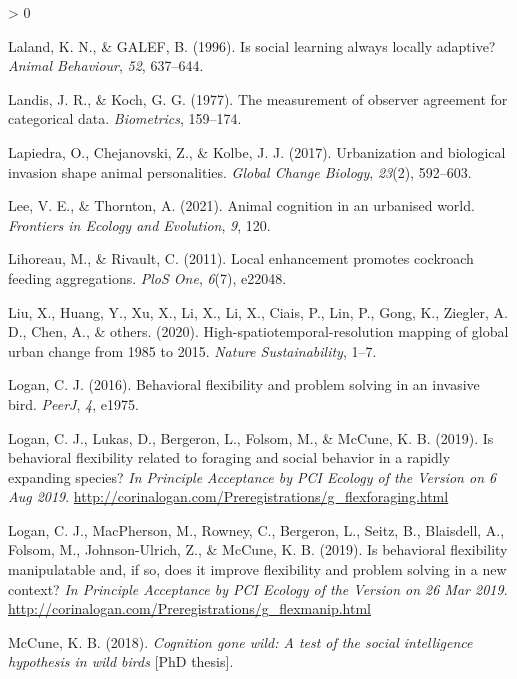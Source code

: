 \documentclass[
]{article}
\newlength{\cslhangindent}
\newenvironment{CSLReferences}[2] %
 {%
  \setlength{\parindent}{0pt}
  \ifodd #1 \everypar{\setlength{\hangindent}{\cslhangindent}}\ignorespaces\fi
  \ifnum #2 > 0
  \setlength{\parskip}{#2\baselineskip}
  \fi
 }%
 {}
\begin{document}
\begin{CSLReferences}{1}{0}
\leavevmode\hypertarget{ref-laland1996social}{}%
Laland, K. N., \& GALEF, B. (1996). Is social learning always locally
adaptive? \emph{Animal Behaviour}, \emph{52}, 637--644.

\leavevmode\hypertarget{ref-landis1977measurement}{}%
Landis, J. R., \& Koch, G. G. (1977). The measurement of observer
agreement for categorical data. \emph{Biometrics}, 159--174.

\leavevmode\hypertarget{ref-lapiedra2017urbanization}{}%
Lapiedra, O., Chejanovski, Z., \& Kolbe, J. J. (2017). Urbanization and
biological invasion shape animal personalities. \emph{Global Change
Biology}, \emph{23}(2), 592--603.

\leavevmode\hypertarget{ref-lee2021animal}{}%
Lee, V. E., \& Thornton, A. (2021). Animal cognition in an urbanised
world. \emph{Frontiers in Ecology and Evolution}, \emph{9}, 120.

\leavevmode\hypertarget{ref-lihoreau2011local}{}%
Lihoreau, M., \& Rivault, C. (2011). Local enhancement promotes
cockroach feeding aggregations. \emph{PloS One}, \emph{6}(7), e22048.

\leavevmode\hypertarget{ref-liu2020high}{}%
Liu, X., Huang, Y., Xu, X., Li, X., Li, X., Ciais, P., Lin, P., Gong,
K., Ziegler, A. D., Chen, A., \& others. (2020).
High-spatiotemporal-resolution mapping of global urban change from 1985
to 2015. \emph{Nature Sustainability}, 1--7.

\leavevmode\hypertarget{ref-logan2016flexibilityproblem}{}%
Logan, C. J. (2016). Behavioral flexibility and problem solving in an
invasive bird. \emph{PeerJ}, \emph{4}, e1975.

\leavevmode\hypertarget{ref-logan2019flexforaging}{}%
Logan, C. J., Lukas, D., Bergeron, L., Folsom, M., \& McCune, K. B.
(2019). Is behavioral flexibility related to foraging and social
behavior in a rapidly expanding species? \emph{In Principle Acceptance
by PCI Ecology of the Version on 6 Aug 2019}.
\url{http://corinalogan.com/Preregistrations/g_flexforaging.html}

\leavevmode\hypertarget{ref-logan2019flexmanip}{}%
Logan, C. J., MacPherson, M., Rowney, C., Bergeron, L., Seitz, B.,
Blaisdell, A., Folsom, M., Johnson-Ulrich, Z., \& McCune, K. B. (2019).
Is behavioral flexibility manipulatable and, if so, does it improve
flexibility and problem solving in a new context? \emph{In Principle
Acceptance by PCI Ecology of the Version on 26 Mar 2019}.
\url{http://corinalogan.com/Preregistrations/g_flexmanip.html}

\leavevmode\hypertarget{ref-mccune2018cognition}{}%
McCune, K. B. (2018). \emph{Cognition gone wild: A test of the social
intelligence hypothesis in wild birds} {[}PhD thesis{]}.


\end{CSLReferences}
\end{document}
